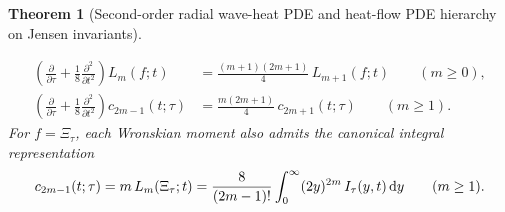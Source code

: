 \documentclass[11pt,reqno]{amsart}
\theoremstyle{plain}
\newtheorem{theorem}{Theorem}[section]
\theoremstyle{definition}
\theoremstyle{remark}
\numberwithin{equation}{section}
\newcommand{\dd}{\,\mathrm{d}}
\newcommand{\fac}{\mathclose{\mathchar"0021}}
\begin{document}
\begin{theorem}[Second-order radial wave-heat PDE and heat-flow PDE hierarchy on Jensen invariants]
\begin{enumerate}[label=\textup{(\roman*)},leftmargin=2.2em]
\begin{equation}\label{eq:boxed_jensen_pde}
\boxed{\;\begin{aligned}
\left(\frac{\partial}{\partial\tau} + \frac{1}{8}\frac{\partial^2}{\partial t^2}\right) L_m(f; t) &= \frac{(m + 1)(2m + 1)}{4}\,L_{m+1}(f; t) \qquad (m \ge 0), \\
\left(\frac{\partial}{\partial\tau} + \frac{1}{8}\frac{\partial^2}{\partial t^2}\right) c_{2m-1}(t;\tau) &= \frac{m(2m + 1)}{4}\,c_{2m+1}(t;\tau) \qquad (m \ge 1).
\end{aligned}\;}
\end{equation}
For $f = \Xi_\tau$, each Wronskian moment also admits the canonical integral representation
\begin{equation}\label{eq:cm_integral}
c_{2m-1}(t;\tau) = m\,L_m(\Xi_\tau; t) = \frac{8}{(2m - 1)\fac}\int_0^{\infty} (2y)^{2m}\,I_\tau(y,t)\dd y \qquad (m \ge 1).
\end{equation}
\end{enumerate}
\end{theorem}
\end{document}
